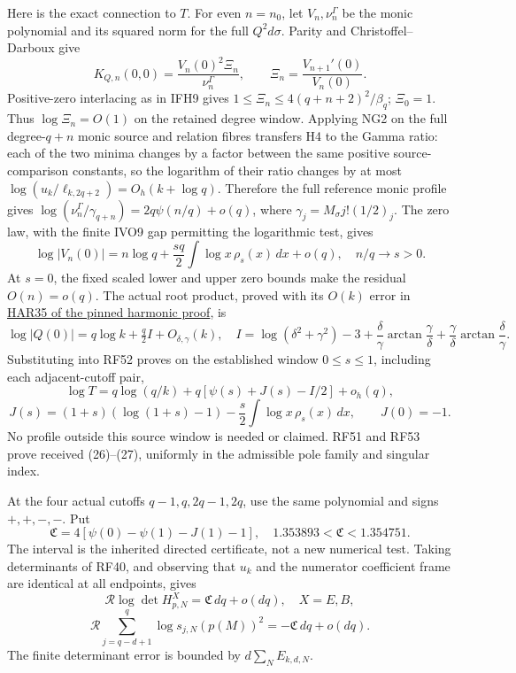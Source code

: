 \documentclass[11pt]{article}
\begin{document}
Here is the exact connection to \(T\). For even \(n=n_0\), let \(V_n,\nu_n^\Gamma\) be the monic polynomial and its squared norm for the full \(Q^2d\sigma\). Parity and Christoffel--Darboux give \[
K_{Q,n}(0,0)=\frac{V_n(0)^2\Xi_n}{\nu_n^\Gamma},
\qquad \Xi_n=\frac{V_{n+1}'(0)}{V_n(0)}.
\tag{RF52}
\] Positive-zero interlacing as in IFH9 gives \(1\le\Xi_n\le4(q+n+2)^2/\beta_q\); \(\Xi_0=1\). Thus \(\log\Xi_n=O(1)\) on the retained degree window. Applying NG2 on the full degree-\(q+n\) monic source and relation fibres transfers H4 to the Gamma ratio: each of the two minima changes by a factor between the same positive source-comparison constants, so the logarithm of their ratio changes by at most \(\log(u_k/\ell_{k,2q+2})=O_h(k+\log q)\). Therefore the full reference monic profile gives \(\log(\nu_n^\Gamma/\gamma_{q+n})=2q\psi(n/q)+o(q)\), where \(\gamma_j=M_\sigma j!(1/2)_j\). The zero law, with the finite IVO9 gap permitting the logarithmic test, gives \[
\log|V_n(0)|=n\log q+\frac{sq}{2}\int\log x\,\rho_s(x)\,dx+o(q),
\quad n/q\to s>0.
\] At \(s=0\), the fixed scaled lower and upper zero bounds make the residual \(O(n)=o(q)\). The actual root product, proved with its \(O(k)\) error in \href{https://github.com/KokunoYumeto/zeta-function-research-reader/blob/360d3c1d798da434966d35f7e407fc59c14f234b/workbenches/splitzero-tandem/continuations/20260921-critical-inverse-activation/HARMONIC_PROOFS.md\#L389}{HAR35 of the pinned harmonic proof}, is \[
\log|Q(0)|=q\log k+\tfrac q2 I+O_{\delta,\gamma}(k),
\quad
I=\log(\delta^2+\gamma^2)-3+
\frac\delta\gamma\arctan\frac\gamma\delta+
\frac\gamma\delta\arctan\frac\delta\gamma .
\] Substituting into RF52 proves on the established window \(0\le s\le1\), including each adjacent-cutoff pair, \[
\log T=q\log(q/k)+q[\psi(s)+J(s)-I/2]+o_h(q),
\] \[
J(s)=(1+s)(\log(1+s)-1)-\frac s2\int\log x\,\rho_s(x)\,dx,\qquad
J(0)=-1.
\tag{RF53}
\] No profile outside this source window is needed or claimed. RF51 and RF53 prove received (26)--(27), uniformly in the admissible pole family and singular index.

At the four actual cutoffs \(q-1,q,2q-1,2q\), use the same polynomial and signs \(+,+,-,-\). Put \[
\mathfrak C=4[\psi(0)-\psi(1)-J(1)-1],
\quad 1.353893<\mathfrak C<1.354751.
\] The interval is the inherited directed certificate, not a new numerical test. Taking determinants of RF40, and observing that \(u_k\) and the numerator coefficient frame are identical at all endpoints, gives \[
\mathcal R\log\det H^X_{p,N}=\mathfrak C\,dq+o(dq),\quad X=E,B,
\] \[
\mathcal R\sum_{j=q-d+1}^{q}\log s_{j,N}(p(M))^2
=-\mathfrak C\,dq+o(dq).
\tag{RF54}
\] The finite determinant error is bounded by \(d\sum_NE_{k,d,N}\).
\end{document}
